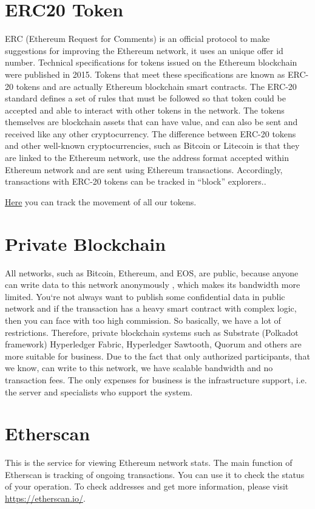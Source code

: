 \documentclass[a4paper,12pt]{report}
\newcommand{\contractAddress}{0x37d29cb7d543300063a50d85389d409c01da7945}
\begin{document}
\section{ERC20 Token}
ERC (Ethereum Request for Comments) is an official protocol to make suggestions for improving the Ethereum network, it uses an unique offer id number. Technical specifications for tokens issued on the Ethereum blockchain were published in 2015. Tokens that meet these specifications are known as ERC-20 tokens and are actually Ethereum blockchain smart contracts. The ERC-20 standard defines a set of rules that must be followed so that  token could be accepted and able to interact with other tokens in the network. The tokens themselves are blockchain assets that can have value, and can also be sent and received like any other cryptocurrency.
The difference between ERC-20 tokens and other well-known cryptocurrencies, such as Bitcoin or Litecoin  is that they are linked to the Ethereum network, use the address format accepted within Ethereum  network and are sent using Ethereum transactions. Accordingly, transactions with  ERC-20 tokens can be tracked in “block” explorers..

\href{https://etherscan.io/address/\contractAddress}{Here} you can track the movement of all our tokens.


\section{Private Blockchain}
All networks, such as Bitcoin, Ethereum, and EOS, are public, because anyone can write data to  this network anonymously , which makes its bandwidth more limited.  You`re not always want to publish some confidential data in public network and if the transaction has a heavy smart contract with complex logic, then you can face with  too high commission. So basically,  we have a lot of restrictions. Therefore, private blockchain systems such as Substrate (Polkadot framework) Hyperledger Fabric, Hyperledger Sawtooth, Quorum and others are more suitable for business. Due to the fact that only authorized participants, that  we  know, can write to this network, we have scalable bandwidth and no transaction fees. The only expenses for  business is the infrastructure support, i.e. the server and specialists who support the system.


\section{Etherscan}
This is the service for viewing Ethereum network stats. The main function of Etherscan is tracking of ongoing transactions. You can use it to check the status of your operation.  To check addresses and get more information, please visit \href{https://etherscan.io/}{https://etherscan.io/}.
\end{document}
